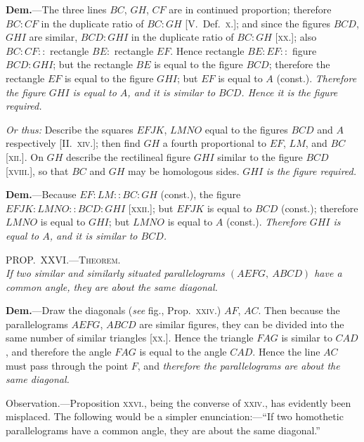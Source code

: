 \documentclass[oneside]{book}
\newcommand\myprop[2]{
\bigskip\Needspace*{4\baselineskip}\begin{center}\textsc{#1}\\\medskip\emph{#2}\par\end{center}
}
\newcommand\imgcent[2]{
\begin{center}
\end{center}
}
\begin{document}
\imgcent{240}{f205}

\textbf{Dem.}---The three lines $BC$, $GH$, $CF$ are in continued
proportion; therefore $BC : CF$ in the duplicate ratio
of $BC : GH$ [V.\ Def.~\textsc{x.}]; and since the figures $BCD$,
$GHI$ are similar, $BCD : GHI$ in the duplicate ratio
of $BC : GH$ [\textsc{xx.}]; also $BC : CF ::$ rectangle $BE :$
rectangle $EF$. Hence rectangle $BE : EF ::$ figure
$BCD : GHI$; but the rectangle $BE$ is equal to the
figure $BCD$; therefore the rectangle $EF$ is equal to
the figure $GHI$; but $EF$ is equal to $A$ (const.). \emph{Therefore
the figure $GHI$ is equal to $A$, and it is similar to
$BCD$. Hence it is the figure required.}

\begin{footnotesize}
\imgcent{260}{f206}

\emph{Or thus:} Describe the squares $EFJK$, $LMNO$ equal to the
figures $BCD$ and $A$ respectively [II\@.~\textsc{xiv.}]; then find $GH$ a fourth
proportional to $EF$, $LM$, and $BC$ [\textsc{xii.}]. On $GH$ describe the
rectilineal figure $GHI$ similar to the figure $BCD$ [\textsc{xviii.}], so that
$BC$ and $GH$ may be homologous sides. $GHI$ \emph{is the figure required.}

\textbf{Dem.}---Because $EF: LM:: BC: GH$ (const.), the figure
$EFJK: LMNO:: BCD: GHI$ [\textsc{xxii.}]; but $EFJK$ is equal to
$BCD$ (const.); therefore $LMNO$ is equal to $GHI$; but $LMNO$ is
equal to $A$ (const.). \emph{Therefore $GHI$ is equal to $A$, and it is similar
to $BCD$.}
\par\end{footnotesize}

\myprop{PROP\@.~XXVI\@.---Theorem.}{If two similar and similarly situated parallelograms
$(AEFG,\ ABCD)$ have a common angle, they are about
the same diagonal.}

\textbf{Dem.}---Draw the diagonals (\emph{see} fig., Prop.~\textsc{xxiv.})
$AF$, $AC$. Then because the parallelograms $AEFG$,
$ABCD$ are similar figures, they can be divided into
the same number of similar triangles [\textsc{xx.}]. Hence
the triangle $FAG$ is similar to $CAD$, and therefore
the angle $FAG$ is equal to the angle $CAD$. Hence
the line $AC$ must pass through the point $F$, and \emph{therefore
the parallelograms are about the same diagonal.}

\smallskip
\begin{footnotesize}
\textsf{Observation.}---Proposition \textsc{xxvi.}, being the converse of \textsc{xxiv.},
has evidently been misplaced. The following would be a simpler
enunciation:---``If two homothetic parallelograms have a common
angle, they are about the same diagonal.''
\par\end{footnotesize}
\end{document}
